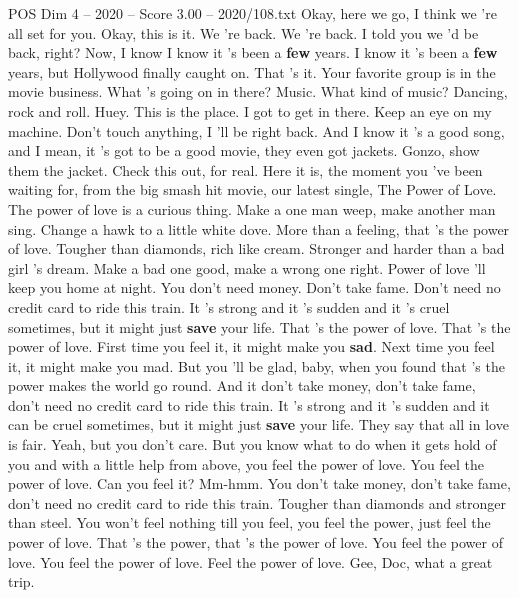 \begin{textsample}{POS Dim 4 – 2020 – Score 3.00 – 2020/108.txt}  \label{ex:f4_pos_022}
Okay, here we go, I think we 're all set for you.
Okay, this is it.
We 're back.
We 're back.
I told you we 'd be back, right?
Now, I know I know it 's been a \textbf{few} years.
I know it 's been a \textbf{few} years, but Hollywood finally caught on.
That 's it.
Your favorite group is in the movie business.
What 's going on in there?
Music.
What kind of music?
Dancing, rock and roll.
Huey.
This is the place.
I got to get in there.
Keep an eye on my machine.
Don't touch anything, I 'll be right back.
And I know it 's a good song, and I mean, it 's got to be a good movie, they even got jackets.
Gonzo, show them the jacket.
Check this out, for real.
Here it is, the moment you 've been waiting for, from the big smash hit movie, our latest single, The Power of Love.
The power of love is a curious thing.
Make a one man weep, make another man sing.
Change a hawk to a little white dove.
More than a feeling, that 's the power of love.
Tougher than diamonds, rich like cream.
Stronger and harder than a bad girl 's dream.
Make a bad one good, make a wrong one right.
Power of love 'll keep you home at night.
You don't need money.
Don't take fame.
Don't need no credit card to ride this train.
It 's strong and it 's sudden and it 's cruel sometimes, but it might just \textbf{save} your life.
That 's the power of love.
That 's the power of love.
First time you feel it, it might make you \textbf{sad}.
Next time you feel it, it might make you mad.
But you 'll be glad, baby, when you found that 's the power makes the world go round.
And it don't take money, don't take fame, don't need no credit card to ride this train.
It 's strong and it 's sudden and it can be cruel sometimes, but it might just \textbf{save} your life.
They say that all in love is fair.
Yeah, but you don't care.
But you know what to do when it gets hold of you and with a little help from above, you feel the power of love.
You feel the power of love.
Can you feel it?
Mm-hmm.
You don't take money, don't take fame, don't need no credit card to ride this train.
Tougher than diamonds and stronger than steel.
You won't feel nothing till you feel, you feel the power, just feel the power of love.
That 's the power, that 's the power of love.
You feel the power of love.
You feel the power of love.
Feel the power of love.
Gee, Doc, what a great trip.

\end{textsample}
